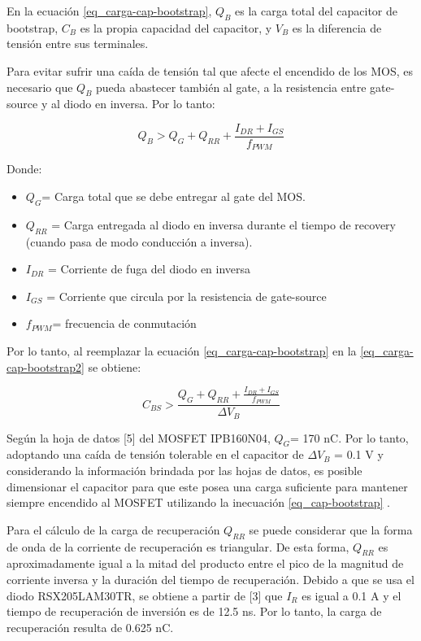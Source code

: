 \noindent En la ecuación \ref{eq_carga-cap-bootstrap}, $Q_B$ es la carga total del capacitor de bootstrap, $C_B$ es la propia capacidad del capacitor, y $V_B$ es la diferencia de  tensión entre sus terminales. 

\noindent Para evitar sufrir una caída de tensión tal que afecte el encendido de los MOS, es necesario que $Q_B$ pueda abastecer también al gate, a la resistencia entre gate-source y al diodo en inversa. Por lo tanto:

\begin{equation} \label{eq_carga-cap-bootstrap2}
Q_B > Q_G + Q_{RR} + \frac{I_{DR}+I_{GS}}{f_{PWM}}
\end{equation}

\noindent Donde:
\begin{itemize}
\item $Q_G$= Carga total que se debe entregar al gate del MOS.
\item $Q_{RR}$ = Carga entregada al diodo en inversa durante el tiempo de recovery (cuando pasa de modo conducción a inversa).
\item $I_{DR}$ = Corriente de fuga del diodo en inversa
\item $I_{GS}$ = Corriente que circula por la resistencia de gate-source
\item $f_{PWM}$= frecuencia de conmutación
\end{itemize}


\noindent Por lo tanto, al reemplazar la ecuación \ref{eq_carga-cap-bootstrap} en la \ref{eq_carga-cap-bootstrap2} se obtiene:


\begin{equation} \label{eq_cap-bootstrap}
C_{BS} > \frac{Q_G+Q_{RR} + \frac{I_{DR}+I_{GS}}{f_{PWM}}}{\Delta V_B}
\end{equation}

\noindent Según la hoja de datos [5] del MOSFET IPB160N04, $Q_G$= 170 nC. Por lo tanto, adoptando una caída de tensión tolerable en el capacitor de $\Delta V_B$ = 0.1 V y considerando la información brindada por las hojas de datos, es posible dimensionar el capacitor para que este posea una carga suficiente para mantener siempre encendido al MOSFET utilizando la inecuación \ref{eq_cap-bootstrap} .

\noindent Para el cálculo de la carga de recuperación $Q_{RR}$ se puede considerar que la forma de onda de la corriente de recuperación es triangular. De esta forma,  $Q_{RR}$ es aproximadamente igual a la mitad del producto entre el pico de la magnitud de corriente inversa y la duración del tiempo de recuperación.  Debido a que se usa el diodo RSX205LAM30TR, se obtiene a partir de [3] que  $I_R$ es igual a 0.1 A  y  el tiempo de recuperación de inversión es de 12.5 ns. Por lo tanto, la carga de recuperación resulta de 0.625 nC.

